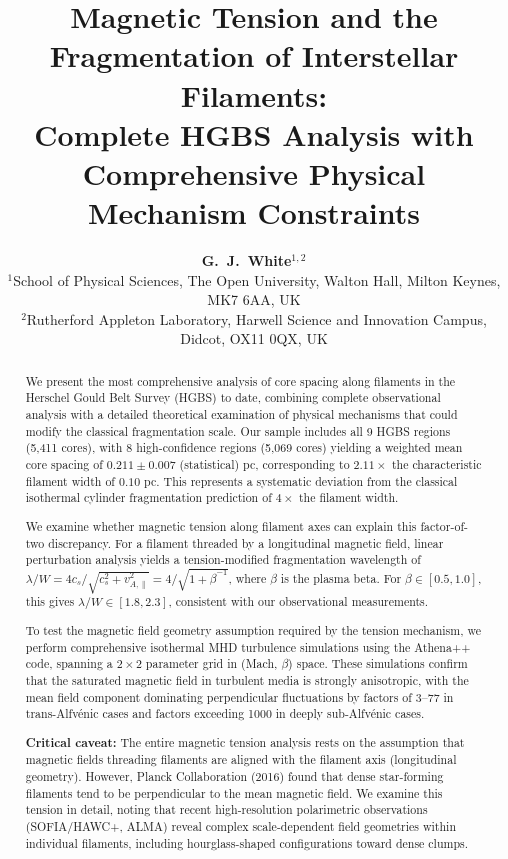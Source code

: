 \documentclass[11pt,a4paper]{article}
\title{\textbf{Magnetic Tension and the Fragmentation of Interstellar Filaments:\\
Complete HGBS Analysis with Comprehensive Physical Mechanism Constraints}}
\author{\textbf{G.~J.~White$^{1,2}$}\\
\small{$^{1}$School of Physical Sciences, The Open University, Walton Hall, Milton Keynes, MK7 6AA, UK}\\
\small{$^{2}$Rutherford Appleton Laboratory, Harwell Science and Innovation Campus, Didcot, OX11 0QX, UK}}
\begin{document}
\maketitle

\begin{abstract}
We present the most comprehensive analysis of core spacing along filaments in the Herschel Gould Belt Survey (HGBS) to date, combining complete observational analysis with a detailed theoretical examination of physical mechanisms that could modify the classical fragmentation scale. Our sample includes all 9 HGBS regions (5,411 cores), with 8 high-confidence regions (5,069 cores) yielding a weighted mean core spacing of $0.211 \pm 0.007$ (statistical) pc, corresponding to $2.11\times$ the characteristic filament width of $0.10$ pc. This represents a systematic deviation from the classical isothermal cylinder fragmentation prediction of $4\times$ the filament width.

We examine whether magnetic tension along filament axes can explain this factor-of-two discrepancy. For a filament threaded by a longitudinal magnetic field, linear perturbation analysis yields a tension-modified fragmentation wavelength of $\lambda/W = 4c_s/\sqrt{c_s^2 + v_{A,\parallel}^2} = 4/\sqrt{1 + \beta^{-1}}$, where $\beta$ is the plasma beta. For $\beta \in [0.5, 1.0]$, this gives $\lambda/W \in [1.8, 2.3]$, consistent with our observational measurements.

To test the magnetic field geometry assumption required by the tension mechanism, we perform comprehensive isothermal MHD turbulence simulations using the Athena++ code, spanning a $2\times2$ parameter grid in (Mach, $\beta$) space. These simulations confirm that the saturated magnetic field in turbulent media is strongly anisotropic, with the mean field component dominating perpendicular fluctuations by factors of 3--77 in trans-Alfv\'enic cases and factors exceeding 1000 in deeply sub-Alfv\'enic cases.

\textbf{Critical caveat:} The entire magnetic tension analysis rests on the assumption that magnetic fields threading filaments are aligned with the filament axis (longitudinal geometry). However, Planck Collaboration (2016) found that dense star-forming filaments tend to be perpendicular to the mean magnetic field. We examine this tension in detail, noting that recent high-resolution polarimetric observations (SOFIA/HAWC+, ALMA) reveal complex scale-dependent field geometries within individual filaments, including hourglass-shaped configurations toward dense clumps.


\end{abstract}
\end{document}
